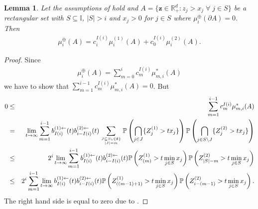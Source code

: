 \documentclass[aos]{imsart}
\numberwithin{equation}{section}
\theoremstyle{plain} %
\newtheorem{lemma}[theorem]{Lemma}
\theoremstyle{remark}
\newcommand{\beao}{\begin{eqnarray*}}
\newcommand{\eeao}{\end{eqnarray*}\noindent}
\renewcommand\P{\mathbb{P}}
\newcommand{\R}{\mathbb{R}}
\def\bz{\boldsymbol z}
\begin{document}
\begin{lemma} \label{Lemma B.3}
Let the assumptions of  hold and
 $A= \{\bz \in \R_+^d: z_j>x_j \;\forall\; j\in S\}$ be a rectangular set with
 $S\subseteq \mathbb{I}$, $|S|>i$ and  $x_{j}>0$ for $j\in S$ {where $\mu_i^{\oplus}(\partial A)=0$.} Then
 \beao
    \mu_i^{\oplus}(A)=c_i^{I(i)}\mu^{(1)}_{i}(A)
        +c_0^{I(i)}\mu^{(2)}_{i}(A).
 \eeao
\end{lemma}
\begin{proof}
    Since 
    \beao
    \mu_i^{\oplus}(A)=\sum_{m=0}^i c_m^{I(i)}\mu_{m,i}^*(A)
 \eeao
 we have to show that $\sum_{m=1}^{i-1} c_m^{I(i)}\mu_{m,i}^*(A)=0$. But
 \beao
    0&\leq&\sum_{m=1}^{i-1} c_m^{I(i)}\mu_{m,i}^*(A)\\
    &= & \lim_{t\to\infty}
   \sum_{m=1}^{i-1}b_{I(i)}^{(1)\leftarrow}(t)b_{i-{I(i)}}^{(2) \leftarrow}(t)
    \sum_{\genfrac{}{}{0pt}{}{J\subseteq S\cup \{\emptyset\}}{|J|=m}}\P\left(\bigcap_{j\in J}\{Z_j^{(1)}>tx_j\}\right)\P\left(\bigcap_{j\in S\backslash J}\{Z_j^{(2)}>tx_j\}\right)  \\
     &\leq& 2^{i}\lim_{t\to\infty}
    \sum_{m=1}^{i-1}
    b_{I(i)}^{(1)\leftarrow}(t)b_{i-{I(i)}}^{(2)\leftarrow}(t)
    \P\left(Z_{(m)}^{(1)}>t\min_{j\in S}x_j\right)\P\left(Z_{|S|-m}^{(2)}>t\min_{j\in S}x_j\right)\\
    &\leq& 2^{i}
    \sum_{m=1}^{i-1}\lim_{t\to\infty}
    b_{I(i)}^{(1)\leftarrow}(t)b_{i-{I(i)}}^{(2)\leftarrow}(t)
    \P\left(Z_{((m-1)+1)}^{(1)}>t\min_{j\in S}x_j\right)\P\left(Z_{i-(m-1)}^{(2)}>t\min_{j\in S}x_j\right).
 \eeao
 The right hand side is equal to zero due to .
\end{proof}
\end{document}

